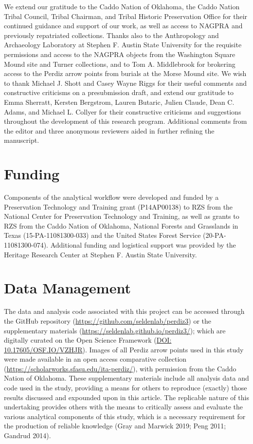 \documentclass[smallextended]{svjour3}       %
\begin{document}
We extend our gratitude to the Caddo Nation of Oklahoma, the Caddo
Nation Tribal Council, Tribal Chairman, and Tribal Historic Preservation
Office for their continued guidance and support of our work, as well as
access to NAGPRA and previously repatriated collections. Thanks also to
the Anthropology and Archaeology Laboratory at Stephen F. Austin State
University for the requisite permissions and access to the NAGPRA
objects from the Washington Square Mound site and Turner collections,
and to Tom A. Middlebrook for brokering access to the Perdiz arrow
points from burials at the Morse Mound site. We wish to thank Michael J.
Shott and Casey Wayne Riggs for their useful comments and constructive
criticisms on a presubmission draft, and extend our gratitude to Emma
Sherratt, Kersten Bergstrom, Lauren Butaric, Julien Claude, Dean C.
Adams, and Michael L. Collyer for their constructive criticisms and
suggestions throughout the development of this research program.
Additional comments from the editor and three anonymous reviewers aided
in further refining the manuscript.

\hypertarget{funding}{%
\section{Funding}\label{funding}}

Components of the analytical workflow were developed and funded by a
Preservation Technology and Training grant (P14AP00138) to RZS from the
National Center for Preservation Technology and Training, as well as
grants to RZS from the Caddo Nation of Oklahoma, National Forests and
Grasslands in Texas (15-PA-11081300-033) and the United States Forest
Service (20-PA-11081300-074). Additional funding and logistical support
was provided by the Heritage Research Center at Stephen F. Austin State
University.

\hypertarget{data-management}{%
\section{Data Management}\label{data-management}}

The data and analysis code associated with this project can be accessed
through the GitHub repository
(\url{https://github.com/seldenlab/perdiz3}) or the supplementary
materials (\url{https://seldenlab.github.io/perdiz3/}); which are
digitally curated on the Open Science Framework \newline 
(\href{https://osf.io/vzhjr/}{DOI: 10.17605/OSF.IO/VZHJR}). Images of
all Perdiz arrow points used in this study were made available in an
open access comparative collection
(\url{https://scholarworks.sfasu.edu/ita-perdiz/}), with permission from
the Caddo Nation of Oklahoma. These supplementary materials include all
analysis data and code used in the study, providing a means for others
to reproduce (exactly) those results discussed and expounded upon in
this article. The replicable nature of this undertaking provides others
with the means to critically assess and evaluate the various analytical
components of this study, which is a necessary requirement for the
production of reliable knowledge (Gray and Marwick 2019; Peng 2011;
Gandrud 2014).
\end{document}
